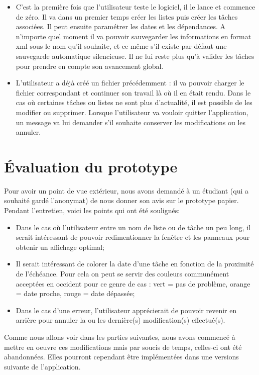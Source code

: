 		\begin{itemize}
			\item C'est la première fois que l'utilisateur teste le logiciel, il le lance et commence de zéro. Il va dans un premier temps créer les listes puis créer les tâches associées. Il peut ensuite paramétrer les dates et les dépendances. A n'importe quel moment il va pouvoir sauvegarder les informations en format xml sous le nom qu'il souhaite, et ce même s'il existe par défaut une sauvegarde automatique silencieuse. Il ne lui reste plus qu'à valider les tâches pour prendre en compte son avancement global.
			\item L'utilisateur a déjà créé un fichier précédemment : il va pouvoir charger le fichier correspondant et continuer son travail là où il en était rendu. Dans le cas où certaines tâches ou listes ne sont plus d'actualité, il est possible de les modifier ou supprimer. Lorsque l'utilisateur va vouloir quitter l'application, un message va lui demander s'il souhaite conserver les modifications ou les annuler. 
		\end{itemize}
	
	\newpage
	\section{Évaluation du prototype}
		Pour avoir un point de vue extérieur, nous avons demandé à un étudiant (qui a souhaité gardé l'anonymat) de nous donner son avis sur le prototype papier. Pendant l'entretien, voici les points qui ont été soulignés:
		\begin{itemize}
			\item Dans le cas où l'utilisateur entre un nom de liste ou de tâche un peu long, il serait intéressant de pouvoir redimentionner la fenêtre et les panneaux pour obtenir un affichage optimal; 
			\item Il serait intéressant de colorer la date d'une tâche en fonction de la proximité de l'échéance. Pour cela on peut se servir des couleurs communément acceptées en occident pour ce genre de cas : vert = pas de problème, orange = date proche, rouge = date dépassée; 
			\item Dans le cas d'une erreur, l'utilisateur apprécierait de pouvoir revenir en arrière pour annuler la ou les dernière(s) modification(s) effectué(s). \\
		\end{itemize}
		
		Comme nous allons voir dans les parties suivantes, nous avons commencé à mettre en oeuvre ces modifications mais par soucis de temps, celles-ci ont été abandonnées. Elles pourront cependant être implémentées dans une versions suivante de l'application.
		


